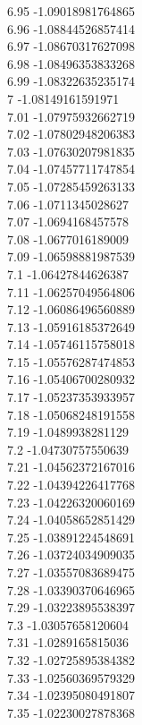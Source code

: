 {6.95	-1.09018981764865\\
6.96	-1.08844526857414\\
6.97	-1.08670317627098\\
6.98	-1.08496353833268\\
6.99	-1.08322635235174\\
7	-1.08149161591971\\
7.01	-1.07975932662719\\
7.02	-1.07802948206383\\
7.03	-1.07630207981835\\
7.04	-1.07457711747854\\
7.05	-1.07285459263133\\
7.06	-1.0711345028627\\
7.07	-1.0694168457578\\
7.08	-1.0677016189009\\
7.09	-1.06598881987539\\
7.1	-1.06427844626387\\
7.11	-1.06257049564806\\
7.12	-1.06086496560889\\
7.13	-1.05916185372649\\
7.14	-1.05746115758018\\
7.15	-1.05576287474853\\
7.16	-1.05406700280932\\
7.17	-1.05237353933957\\
7.18	-1.05068248191558\\
7.19	-1.0489938281129\\
7.2	-1.04730757550639\\
7.21	-1.04562372167016\\
7.22	-1.04394226417768\\
7.23	-1.04226320060169\\
7.24	-1.04058652851429\\
7.25	-1.03891224548691\\
7.26	-1.03724034909035\\
7.27	-1.03557083689475\\
7.28	-1.03390370646965\\
7.29	-1.03223895538397\\
7.3	-1.03057658120604\\
7.31	-1.0289165815036\\
7.32	-1.02725895384382\\
7.33	-1.02560369579329\\
7.34	-1.02395080491807\\
7.35	-1.02230027878368\\
}
